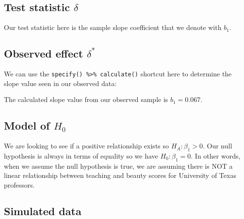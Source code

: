 \documentclass[12pt, krantz2,]{krantz}
\makeatletter
\newenvironment{Shaded}{\begin{snugshade}}{\end{snugshade}}
\newcommand{\DataTypeTok}[1]{\textcolor[rgb]{0.27,0.27,0.27}{#1}}
\newcommand{\KeywordTok}[1]{\textcolor[rgb]{0.27,0.27,0.27}{\textbf{#1}}}
\newcommand{\NormalTok}[1]{#1}
\newcommand{\OperatorTok}[1]{\textcolor[rgb]{0.43,0.43,0.43}{\textbf{#1}}}
\newcommand{\StringTok}[1]{\textcolor[rgb]{0.5,0.5,0.5}{#1}}
\newenvironment{kframe}{%
\medskip{}
\setlength{\fboxsep}{.8em}
 \def\at@end@of@kframe{}%
 \ifinner\ifhmode%
  \def\at@end@of@kframe{\end{minipage}}%
  \begin{minipage}{\columnwidth}%
 \fi\fi%
 \def\FrameCommand##1{\hskip\@totalleftmargin \hskip-\fboxsep
 \colorbox{shadecolor}{##1}\hskip-\fboxsep
     \hskip-\linewidth \hskip-\@totalleftmargin \hskip\columnwidth}%
 \MakeFramed {\advance\hsize-\width
   \@totalleftmargin\z@ \linewidth\hsize
   \@setminipage}}%
 {\par\unskip\endMakeFramed%
 \at@end@of@kframe}
\renewenvironment{Shaded}{\begin{kframe}}{\end{kframe}}
\makeatother
\begin{document}
\hypertarget{test-statistic-delta-1}{%
\subsection{\texorpdfstring{Test statistic \(\delta\)}{Test statistic \textbackslash{}delta}}\label{test-statistic-delta-1}}

Our test statistic here is the sample slope coefficient that we denote with \(b_1\).

\hypertarget{observed-effect-delta-1}{%
\subsection{\texorpdfstring{Observed effect \(\delta^*\)}{Observed effect \textbackslash{}delta\^{}*}}\label{observed-effect-delta-1}}

We can use the \texttt{specify()\ \%\textgreater{}\%\ calculate()} shortcut here to determine the slope value seen in our observed data:

\begin{Shaded}
\end{Shaded}

The calculated slope value from our observed sample is \(b_1 = 0.067\).

\hypertarget{model-of-h_0-1}{%
\subsection{\texorpdfstring{Model of \(H_0\)}{Model of H\_0}}\label{model-of-h_0-1}}

We are looking to see if a positive relationship exists so \(H_A: \beta_1 > 0\). Our null hypothesis is always in terms of equality so we have \(H_0: \beta_1 = 0\). In other words, when we assume the null hypothesis is true, we are assuming there is NOT a linear relationship between teaching and beauty scores for University of Texas professors.

\hypertarget{simulated-data-1}{%
\subsection{Simulated data}\label{simulated-data-1}}
\end{document}
